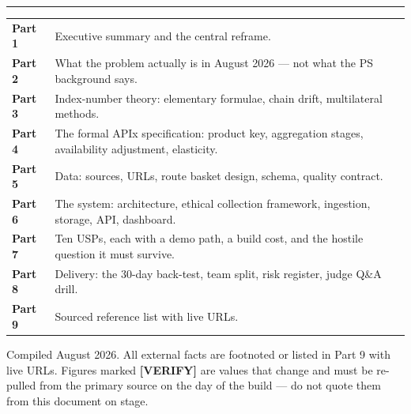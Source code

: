 \begin{titlepage}
\vspace{5mm}
{\color{rulegrey}\rule{\textwidth}{0.8pt}}
\vspace{5mm}

\begin{keybox}
\par\vspace{4pt}
{\footnotesize
\begin{tabularx}{\linewidth}{@{}>{\bfseries}l X@{}}
Part 1 & Executive summary and the central reframe. \\
Part 2 & What the problem actually is in August 2026 --- not what the PS background says. \\
Part 3 & Index-number theory: elementary formulae, chain drift, multilateral methods. \\
Part 4 & The formal APIx specification: product key, aggregation stages, availability adjustment, elasticity. \\
Part 5 & Data: sources, URLs, route basket design, schema, quality contract. \\
Part 6 & The system: architecture, ethical collection framework, ingestion, storage, API, dashboard. \\
Part 7 & Ten USPs, each with a demo path, a build cost, and the hostile question it must survive. \\
Part 8 & Delivery: the 30-day back-test, team split, risk register, judge Q\&A drill. \\
Part 9 & Sourced reference list with live URLs. \\
\end{tabularx}}
\end{keybox}

\vfill
{\footnotesize\color{apixgrey}
Compiled August 2026. All external facts are footnoted or listed in Part 9 with live URLs.
Figures marked \textbf{[VERIFY]} are values that change and must be re-pulled from the
primary source on the day of the build --- do not quote them from this document on stage.\par}

\end{titlepage}

\setcounter{page}{1}
{\hypersetup{linkcolor=apixblue}
\tableofcontents}
\clearpage
{}
\setcounter{page}{1}
